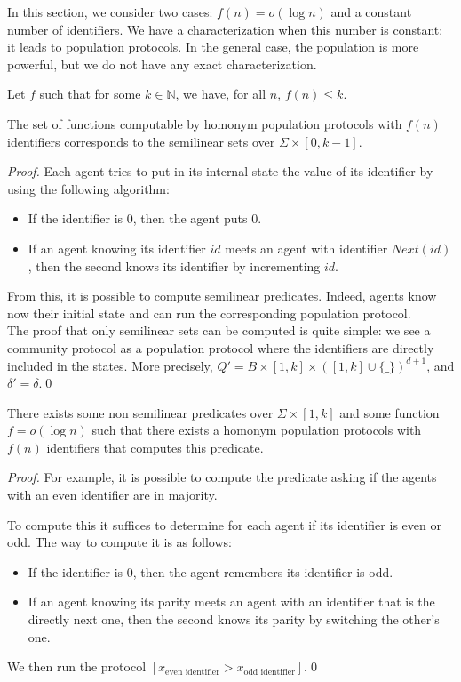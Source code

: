 \documentclass[UKenglish]{llncs}
\newcommand\N{\mathbb{N}}
\begin{document}
In this section, we consider two cases: $f(n)=o(\log n)$ and
a constant number of identifiers.
We have a characterization when
this number is constant: it leads to population protocols. In the general case,
the population is more powerful, but we do not have any exact characterization.



\begin{theorem}\label{hppconst}
Let $f$ such that for some $k\in\N$, we have, for all $n$, $f(n)\le k$.

The set of functions computable by homonym population protocols with $f(n)$
identifiers corresponds to the semilinear sets over $\Sigma\times[0,k-1]$.
\end{theorem}
\begin{proof}
Each agent tries to put in its internal state the value of its identifier 
by using the following algorithm:
\begin{itemize}
\item If the identifier is $0$, then the agent puts $0$.
\item If an agent knowing its identifier $id$ meets an agent with identifier $Next(id)$, then
the second knows its identifier by incrementing $id$.
\end{itemize}
From this,  it is possible to compute semilinear predicates.
Indeed, agents know now their initial state and can run the corresponding population protocol.\\

The proof that only semilinear sets can be computed is quite simple: we see a community protocol
as a population protocol where the identifiers are directly included in the states.
More precisely, $Q'=B\times[1,k]\times([1,k]\cup\{\_\})^{d+1}$, and $\delta'=\delta$.\hfill \qed

\end{proof}

\begin{proposition}\label{contrex1}
There exists some non semilinear predicates over $\Sigma\times[1,k]$
and some function $f=o(\log n)$ such that there exists
a homonym population protocols with $f(n)$ identifiers that computes this predicate.
\end{proposition}
\begin{proof}
For example, it is possible to compute the predicate asking if the
 agents with an even identifier are in majority.

To compute this it suffices to determine for each agent if its identifier
is even or odd. The way to compute it is as follows:
\begin{itemize}
\item If the identifier is $0$, then the agent remembers its identifier is odd.
\item If an agent knowing its parity meets an agent with an identifier
that is the directly next one, then
the second knows its parity by switching the other's one.
\end{itemize}
We then run the protocol $[x_{\text{even identifier}}>x_{\text{odd identifier}}]$.\hfill \qed

\end{proof}
\end{document}
